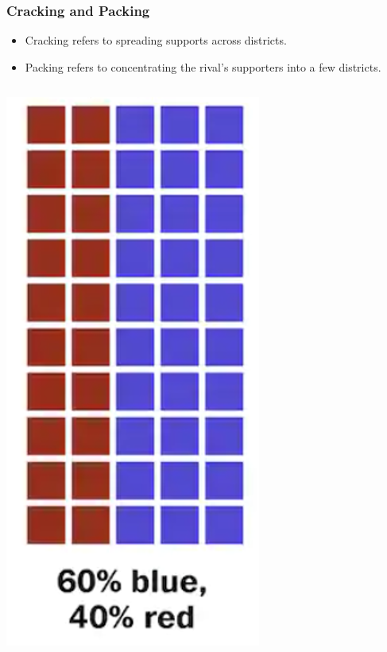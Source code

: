 \documentclass[red]{beamer}
\begin{document}
\begin{frame} [t]
\begin{columns}
\begin{column}{0.40\textwidth}
    \label{fig:AL_districts}
    \end{column}
    \end{columns}
    \end{frame}

    \begin{frame} [t]
    \frametitle{Cracking and Packing}
    \begin{itemize}
        \item Cracking refers to spreading supports across districts.
        \item Packing refers to concentrating the rival’s supporters into a few districts.
    \end{itemize}
    \begin{columns}
    \begin{column}{0.35\textwidth}
    \includegraphics[scale = .5]{example_crack_and_pack.png}

\end{column}
\end{columns}
\end{frame}
\end{document}
